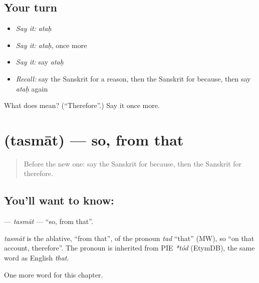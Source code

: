 \subsection*{Your turn}
\begin{itemize}
\raggedright
  \item \emph{Say it:} \emph{ataḥ}
  \item \emph{Say it:} \emph{ataḥ}, once more
  \item \emph{Say it:} say \emph{ataḥ}
  \item \emph{Recall:} say the Sanskrit for a reason, then the Sanskrit for because, then say \emph{ataḥ} again
\end{itemize}

\begin{tcolorbox}[breakable,colback=teal!4,colframe=teal!35!black,title={Before you move on}]
What does  mean? (\textquotedblleft{}Therefore\textquotedblright{}.) Say it once more.
\end{tcolorbox}
\section[\texorpdfstring{\sk{तस्मात्} (tasmāt)}{तस्मात् (tasmāt)}]{ (tasmāt) — so, from that}

\label{lesson:SA-C98-tasmat}



\begin{quote}
Before the new one: say the Sanskrit for because, then the Sanskrit for therefore.
\end{quote}

\subsection*{You'll want to know: }
\textbf{} — \emph{tasmāt} — \textquotedblleft{}so, from that\textquotedblright{}.

\begin{cousinweb}
\emph{tasmāt} is the ablative, \textquotedblleft{}from that\textquotedblright{}, of the pronoun \emph{tad} \textquotedblleft{}that\textquotedblright{} (MW), so \textquotedblleft{}on that account, therefore\textquotedblright{}. The pronoun is inherited from PIE \emph{*tód} (EtymDB), the same word as English \emph{that}.
\end{cousinweb}

\begin{grammarlens}[title={What you've built}]
One more word for this chapter.
\end{grammarlens}

